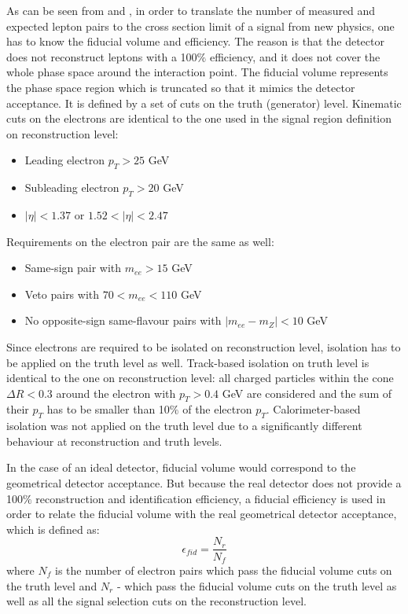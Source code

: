 As can be seen from  and , in order to translate the number of measured and expected lepton pairs 
to the cross section limit of a signal from new physics, one has to know the fiducial volume and efficiency.
The reason is that the detector does not reconstruct leptons with a 100$\%$ efficiency, and it does not cover the whole phase space around the interaction point.
The fiducial volume represents the phase space region which is truncated so that it mimics the detector acceptance.
It is defined by a set of cuts on the truth (generator) level. 
Kinematic cuts on the electrons are identical to the one used in the signal region definition on reconstruction level:
\begin{itemize}
 \item Leading electron $p_T > 25$ GeV
 \item Subleading electron $p_T > 20$ GeV
 \item $|\eta|<1.37$ or $1.52<|\eta|<2.47$
\end{itemize}
Requirements on the electron pair are the same as well:
\begin{itemize}
 \item Same-sign pair with $m_{ee} > 15$ GeV
 \item Veto pairs with $70 < m_{ee} < 110$ GeV
 \item No opposite-sign same-flavour pairs with $|m_{ee} - m_{Z}| < 10$ GeV
\end{itemize}
Since electrons are required to be isolated on reconstruction level, isolation has to be applied on the truth level as well.
Track-based isolation on truth level is identical to the one on reconstruction level:
all charged particles within the cone $\Delta R < 0.3$ around the electron with $p_T > 0.4$ GeV are considered and the
sum of their $p_T$ has to be smaller than 10$\%$ of the electron $p_T$.
Calorimeter-based isolation was not applied on the truth level due to a significantly different behaviour at reconstruction and truth levels.

In the case of an ideal detector, fiducial volume would correspond to the geometrical detector acceptance.
But because the real detector does not provide a 100$\%$ reconstruction and identification efficiency, a fiducial efficiency is used in order to relate the fiducial volume with the real geometrical detector acceptance, which is defined as:
\begin{equation}
 \epsilon_{fid} = \dfrac{N_r}{N_f}
\end{equation}
where $N_f$ is the number of electron pairs which pass the fiducial volume cuts on the truth level and $N_r$ - which pass the fiducial volume cuts on the truth level 
as well as all the signal selection cuts on the reconstruction level.


